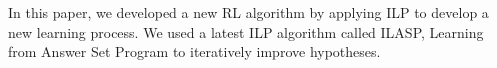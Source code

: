 In this paper, we developed a new RL algorithm by applying ILP to develop a new learning process.
We used a latest ILP algorithm called ILASP, Learning from Answer Set Program to iteratively improve hypotheses.